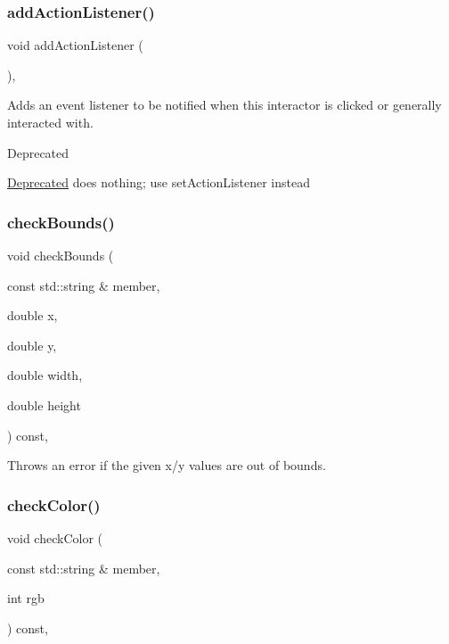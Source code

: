 \subsubsection{\texorpdfstring{add\+Action\+Listener()}{addActionListener()}}
{\footnotesize\ttfamily void add\+Action\+Listener (\begin{DoxyParamCaption}{ }\end{DoxyParamCaption})\hspace{0.3cm}{\ttfamily [virtual]}, {\ttfamily [inherited]}}



Adds an event listener to be notified when this interactor is clicked or generally interacted with. 

\begin{DoxyRefDesc}{Deprecated}
\item[\mbox{\hyperlink{deprecated__deprecated000006}{Deprecated}}]does nothing; use set\+Action\+Listener instead \end{DoxyRefDesc}
\mbox{\label{classGDrawingSurface_a3a690bcb2d62250c9e4722ad7c1b9ab6}} 
\subsubsection{\texorpdfstring{check\+Bounds()}{checkBounds()}}
{\footnotesize\ttfamily void check\+Bounds (\begin{DoxyParamCaption}\item[{const std\+::string \&}]{member,  }\item[{double}]{x,  }\item[{double}]{y,  }\item[{double}]{width,  }\item[{double}]{height }\end{DoxyParamCaption}) const\hspace{0.3cm}{\ttfamily [protected]}, {\ttfamily [inherited]}}



Throws an error if the given x/y values are out of bounds. 

\mbox{\label{classGDrawingSurface_a9841b5dc607ca41a14819d80e1d8a09c}} 
\subsubsection{\texorpdfstring{check\+Color()}{checkColor()}}
{\footnotesize\ttfamily void check\+Color (\begin{DoxyParamCaption}\item[{const std\+::string \&}]{member,  }\item[{int}]{rgb }\end{DoxyParamCaption}) const\hspace{0.3cm}{\ttfamily [protected]}, {\ttfamily [inherited]}}



